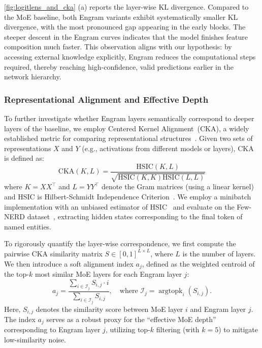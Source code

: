 \autoref{fig:logitlens_and_cka} (a) reports the layer-wise KL divergence. Compared to the MoE baseline, both Engram variants exhibit systematically smaller KL divergence, with the most pronounced gap appearing in the early blocks. The steeper descent in the Engram curves indicates that the model finishes feature composition much faster. This observation aligns with our hypothesis: by accessing external knowledge explicitly, Engram reduces the computational steps required, thereby reaching high-confidence, valid predictions earlier in the network hierarchy.

\subsubsection{Representational Alignment and Effective Depth}

To further investigate whether Engram layers semantically correspond to deeper layers of the baseline, we employ Centered Kernel Alignment~(CKA), a widely established metric for comparing representational structures~\citep{kornblith2019similarity,kriegeskorte2008representational}. Given two sets of representations $X$ and $Y$ (e.g., activations from different models or layers), CKA is defined as:
\begin{equation}
    \text{CKA}(K, L) = \frac{\text{HSIC}(K, L)}{\sqrt{\text{HSIC}(K, K)\text{HSIC}(L, L)}}
\end{equation}
where $K = XX^\top$ and $L = YY^\top$ denote the Gram matrices (using a linear kernel) and HSIC is Hilbert-Schmidt Independence Criterion~\citep{gretton2005measuring}. We employ a minibatch implementation with an unbiased estimator of HSIC~\citep{davari2022reliability} and evaluate on the Few-NERD dataset~\citep{ding2021few}, extracting hidden states corresponding to the final token of named entities.

To rigorously quantify the layer-wise correspondence, 
we first compute the pairwise CKA similarity matrix $S \in [0, 1]^{L \times L}$, where $L$ is the number of layers. We then introduce a soft alignment index $a_j$, defined as the weighted centroid of the top-$k$ most similar MoE layers for each Engram layer $j$:
\begin{equation}
    a_j = \frac{\sum_{i \in \mathcal{I}_j} S_{i,j} \cdot i}{\sum_{i \in \mathcal{I}_j} S_{i,j}}, \quad \text{where } \mathcal{I}_j = \mathop{\text{argtop}k}_{i} (S_{i,j}). 
\end{equation}
Here, $S_{i,j}$ denotes the similarity score between MoE layer $i$ and Engram layer $j$. The index $a_j$ serves as a robust proxy for the ``effective MoE depth'' corresponding to Engram layer $j$, utilizing top-$k$ filtering (with $k=5$) to mitigate low-similarity noise.

